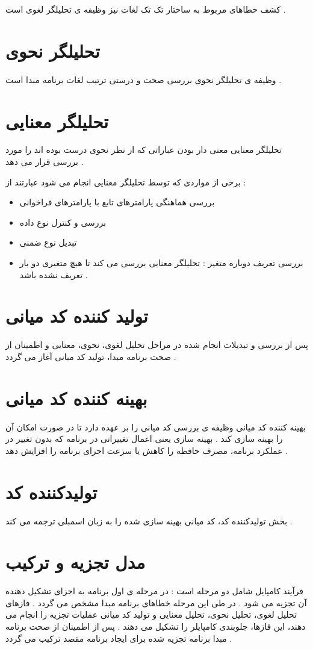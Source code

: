 \documentclass{book}
\begin{document}
کشف خطاهای مربوط به ساختار تک تک لغات نیز وظیفه ی تحلیلگر لغوی است .


\section{تحلیلگر نحوی}
وظیفه ی تحلیلگر نحوی بررسی صحت و درستی ترتیب لغات برنامه مبدا است .

\section{تحلیلگر معنایی}
تحلیلگر معنایی معنی دار بودن عباراتی که از نظر نحوی درست بوده اند را مورد بررسی قرار می دهد .

برخی از مواردی که توسط تحلیلگر معنایی انجام می شود عبارتند از :

\begin{itemize}
	\item بررسی هماهنگی پارامترهای تابع با پارامترهای فراخوانی
	\item بررسی و کنترل نوع داده
	\item تبدیل نوع ضمنی
	\item بررسی تعریف دوباره متغیر : تحلیلگر معنایی بررسی می کند تا هیچ متغیری دو بار تعریف نشده باشد .
\end{itemize}


\section{تولید کننده کد میانی}
پس از بررسی و تبدیلات انجام شده در مراحل تحلیل لغوی، نحوی، معنایی و اطمینان از صحت برنامه مبدا، تولید کد میانی آغاز می گردد .


\section{بهینه کننده کد میانی}
بهینه کننده کد میانی وظیفه ی بررسی کد میانی را بر عهده دارد تا در صورت امکان آن را بهینه سازی کند . بهینه سازی یعنی اعمال تغییراتی در برنامه که بدون تغییر در عملکرد برنامه، مصرف حافظه را کاهش یا سرعت اجرای برنامه را افزایش دهد .


\section{تولیدکننده کد}
بخش تولیدکننده کد، کد میانی بهینه سازی شده را به زبان اسمبلی ترجمه می کند .


\section{مدل تجزیه و ترکیب}
فرآیند کامپایل شامل دو مرحله است : در مرحله ی اول برنامه به اجزای تشکیل دهنده آن تجزیه می شود . در طی این مرحله خطاهای برنامه مبدا مشخص می گردد . فازهای تحلیل لغوی، تحلیل نحوی، تحلیل معنایی و تولید کد میانی عملیات تجزیه را انجام می دهند، این فازها، جلوبندی کامپایلر را تشکیل می دهند . پس از اطمینان از صحت برنامه مبدا برنامه تجزیه شده برای ایجاد برنامه مقصد ترکیب می گردد .
\end{document}
